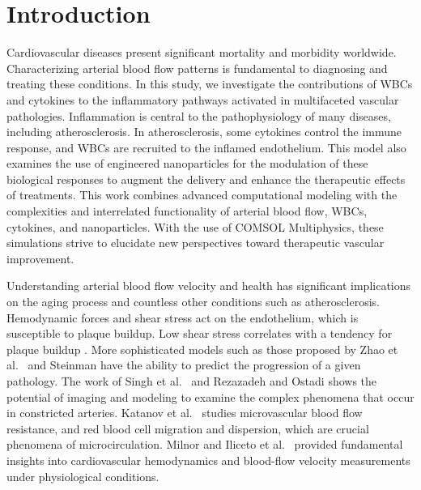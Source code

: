 \documentclass[10pt]{NSP1}
\begin{document}
	
	\maketitle
	
	\section{Introduction}
	
	Cardiovascular diseases present significant mortality and morbidity worldwide. Characterizing arterial blood flow patterns is fundamental to diagnosing and treating these conditions. In this study, we investigate the contributions of WBCs and cytokines to the inflammatory pathways activated in multifaceted vascular pathologies. Inflammation is central to the pathophysiology of many diseases, including atherosclerosis. In atherosclerosis, some cytokines control the immune response, and WBCs are recruited to the inflamed endothelium. This model also examines the use of engineered nanoparticles for the modulation of these biological responses to augment the delivery and enhance the therapeutic effects of treatments. This work combines advanced computational modeling with the complexities and interrelated functionality of arterial blood flow, WBCs, cytokines, and nanoparticles. With the use of COMSOL Multiphysics, these simulations strive to elucidate new perspectives toward therapeutic vascular improvement.
	
	Understanding arterial blood flow velocity and health has significant implications on the aging process and countless other conditions such as atherosclerosis. Hemodynamic forces and shear stress act on the endothelium, which is susceptible to plaque buildup. Low shear stress correlates with a tendency for plaque buildup \cite{Ku1997}. More sophisticated models such as those proposed by Zhao et al.\ \cite{Zhao2000} and Steinman \cite{Steinman2004} have the ability to predict the progression of a given pathology. The work of Singh et al.\ \cite{Singh2010} and Rezazadeh and Ostadi \cite{Rezazadeh2022} shows the potential of imaging and modeling to examine the complex phenomena that occur in constricted arteries. Katanov et al.\ \cite{Katanov2015} studies microvascular blood flow resistance, and red blood cell migration and dispersion, which are crucial phenomena of microcirculation. Milnor \cite{Milnor1989} and Iliceto et al.\ \cite{Iliceto1991} provided fundamental insights into cardiovascular hemodynamics and blood-flow velocity measurements under physiological conditions.
	
\end{document}

